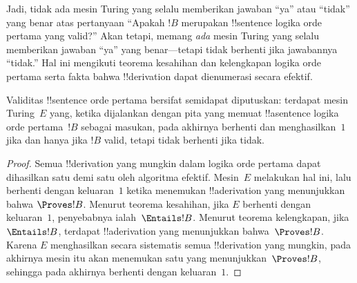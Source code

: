 \documentclass[../../../include/open-logic-section]{subfiles}
\begin{document}
\begin{explain}
Jadi, tidak ada mesin Turing yang selalu memberikan jawaban ``ya'' atau
``tidak'' yang benar atas pertanyaan ``Apakah $!B$ merupakan !!{sentence}
logika orde pertama yang valid?'' Akan tetapi, memang \emph{ada} mesin Turing
yang selalu memberikan jawaban ``ya'' yang benar---tetapi tidak berhenti jika
jawabannya ``tidak.'' Hal ini mengikuti teorema kesahihan dan kelengkapan
logika orde pertama serta fakta bahwa !!{derivation} dapat dienumerasi secara
efektif.
\end{explain}

\begin{thm}
  Validitas !!{sentence} orde pertama bersifat semidapat diputuskan: terdapat
  mesin Turing~$E$ yang, ketika dijalankan dengan pita yang memuat
  !!a{sentence} logika orde pertama~$!B$ sebagai masukan, pada akhirnya
  berhenti dan menghasilkan~$1$ jika dan hanya jika $!B$ valid, tetapi tidak
  berhenti jika tidak.
\end{thm}

\begin{proof}
  Semua !!{derivation} yang mungkin dalam logika orde pertama dapat dihasilkan
  satu demi satu oleh algoritma efektif. Mesin~$E$ melakukan hal ini, lalu
  berhenti dengan keluaran~$1$ ketika menemukan !!a{derivation} yang
  menunjukkan bahwa $\Proves !B$. Menurut teorema kesahihan, jika $E$
  berhenti dengan keluaran~$1$, penyebabnya ialah~$\Entails !B$. Menurut
  teorema kelengkapan, jika $\Entails !B$, terdapat !!a{derivation} yang
  menunjukkan bahwa~$\Proves !B$. Karena $E$ menghasilkan secara sistematis
  semua !!{derivation} yang mungkin, pada akhirnya mesin itu akan menemukan
  satu yang menunjukkan~$\Proves !B$, sehingga pada akhirnya berhenti dengan
  keluaran~$1$.
\end{proof}
\end{document}
